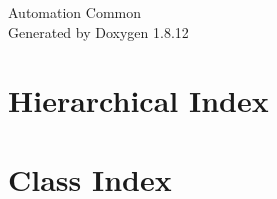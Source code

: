 \documentclass[twoside]{book}
\newcommand{\+}{\discretionary{\mbox{\scriptsize$\hookleftarrow$}}{}{}}
\newcommand{\clearemptydoublepage}{%
  \newpage{\pagestyle{empty}\cleardoublepage}%
}
\begin{document}
\hypersetup{pageanchor=false,
             bookmarksnumbered=true,
             pdfencoding=unicode
            }
\begin{titlepage}
\vspace*{7cm}
\begin{center}%
{\Large Automation Common }\\
\vspace*{1cm}
{\large Generated by Doxygen 1.8.12}\\
\end{center}
\end{titlepage}
\clearemptydoublepage
{}
\tableofcontents
\clearemptydoublepage
{}
\hypersetup{pageanchor=true}

\chapter{Hierarchical Index}

\chapter{Class Index}

\end{document}
